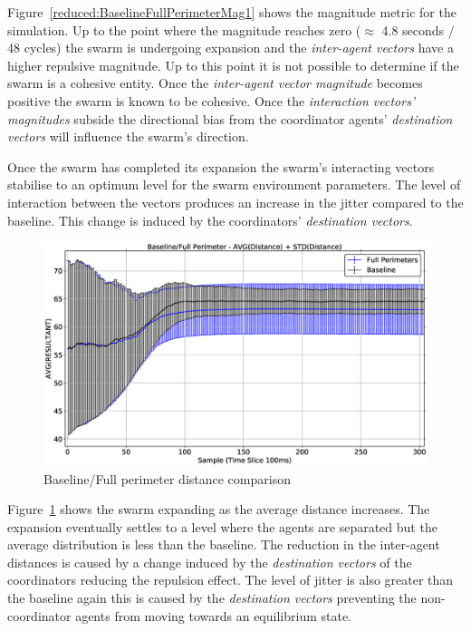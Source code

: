 Figure~\ref{reduced:BaselineFullPerimeterMag1} shows the magnitude metric for the simulation. Up to the point where the magnitude reaches zero ($\approx$ 4.8 seconds / 48 cycles) the swarm is undergoing expansion and the \textit{inter-agent vectors} have a higher repulsive magnitude. Up to this point it is not possible to determine if the swarm is a cohesive entity. Once the \textit{inter-agent vector magnitude} becomes positive the swarm is known to be cohesive. Once the \textit{interaction vectors' magnitudes} subside the directional bias from the coordinator agents' \textit{destination vectors} will influence the swarm's direction. 

Once the swarm has completed its expansion the swarm's interacting vectors stabilise to an optimum level for the swarm environment parameters. The level of interaction between the vectors produces an increase in the jitter compared to the baseline. This change is induced by the coordinators' \textit{destination vectors}.

\begin{figure}[H]
\begin{center}
\includegraphics[width=14cm]{CHAPTER-6/figures/BaselineFullPerimeterDist1}
\end{center}
\caption{Baseline/Full perimeter distance comparison\label{reduced:BaselineFullPerimeterDist1}}
\end{figure}

Figure~\ref{reduced:BaselineFullPerimeterDist1} shows the swarm expanding as the average distance increases. The expansion eventually settles to a level where the agents are separated but the average distribution is less than the baseline. The reduction in the inter-agent distances is caused by a change induced by the \textit{destination vectors} of the coordinators reducing the repulsion effect. The level of jitter is also greater than the baseline again this is caused by the \textit{destination vectors} preventing the non-coordinator agents from moving towards an equilibrium state.

